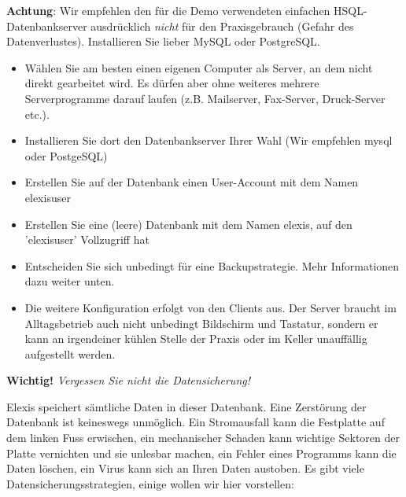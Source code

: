 \textbf{Achtung}: Wir empfehlen den für die Demo verwendeten einfachen HSQL-Datenbankserver ausdrücklich \textit{nicht} für den Praxisgebrauch (Gefahr des Datenverlustes). Installieren Sie lieber MySQL oder PostgreSQL.
\begin{itemize}
 \item Wählen Sie am besten einen eigenen Computer als Server, an dem nicht direkt gearbeitet wird. Es dürfen aber ohne 
 weiteres mehrere Serverprogramme darauf laufen (z.B. Mailserver, Fax-Server, Druck-Server etc.).
 \item Installieren Sie dort den Datenbankserver Ihrer Wahl (Wir empfehlen mysql oder PostgeSQL)
 \item Erstellen Sie auf der Datenbank einen User-Account mit dem Namen elexisuser
 \item Erstellen Sie eine (leere) Datenbank mit dem Namen elexis, auf den 'elexisuser' Vollzugriff hat
 \item Entscheiden Sie sich unbedingt für eine Backupstrategie. Mehr Informationen dazu weiter unten.
 \item Die weitere Konfiguration erfolgt von den Clients aus. Der Server braucht im Alltagsbetrieb auch nicht unbedingt 
 Bildschirm und Tastatur, sondern er kann an irgendeiner kühlen Stelle der Praxis oder im Keller unauffällig 
 aufgestellt werden.
\end{itemize}

\textbf{Wichtig!}
\textit{Vergessen Sie nicht die Datensicherung!}

Elexis speichert sämtliche Daten in dieser Datenbank. Eine Zerstörung der Datenbank ist keineswegs unmöglich.
Ein Stromausfall kann die Festplatte  \glqq  auf dem linken Fuss\grqq{}  erwischen,
ein mechanischer Schaden kann wichtige Sektoren der Platte vernichten und sie
unlesbar machen, ein Fehler eines Programms kann die Daten löschen, ein Virus
kann sich an Ihren Daten austoben. Es gibt viele Datensicherungsstrategien, 
einige wollen wir hier vorstellen:

